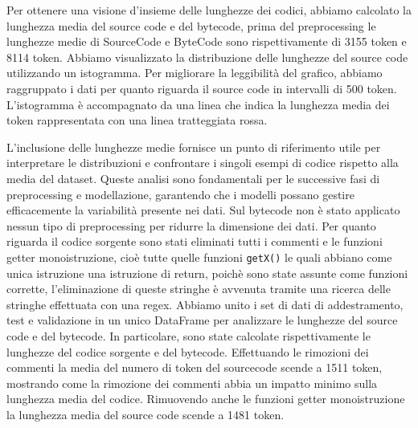\documentclass[../../Thesis.tex]{subfiles}
\begin{document}
Per ottenere una visione d'insieme delle lunghezze dei codici, abbiamo calcolato la lunghezza media del source code e del bytecode, prima del preprocessing le lunghezze medie di SourceCode e ByteCode sono rispettivamente di 3155 token e 8114 token.
Abbiamo visualizzato la distribuzione delle lunghezze del source code utilizzando un istogramma. Per migliorare la leggibilità del grafico, abbiamo raggruppato i dati per quanto riguarda il source code in intervalli di 500 token. L'istogramma è accompagnato da una linea che indica la lunghezza media dei token rappresentata con una linea tratteggiata rossa.

L'inclusione delle lunghezze medie fornisce un punto di riferimento utile per interpretare le distribuzioni e confrontare i singoli esempi di codice rispetto alla media del dataset. Queste analisi sono fondamentali per le successive fasi di preprocessing e modellazione, garantendo che i modelli possano gestire efficacemente la variabilità presente nei dati.
Sul bytecode non è stato applicato nessun tipo di preprocessing per ridurre la dimensione dei dati. Per quanto riguarda il codice sorgente sono stati eliminati tutti i commenti e le funzioni getter monoistruzione, cioè tutte quelle funzioni \texttt{getX()} le quali abbiano come unica istruzione una istruzione di return, poichè sono state assunte come funzioni corrette, l'eliminazione di queste stringhe è avvenuta tramite una ricerca delle stringhe effettuata con una regex.
Abbiamo unito i set di dati di addestramento, test e validazione in un unico DataFrame per analizzare le lunghezze del source code e del bytecode. In particolare, sono state calcolate rispettivamente le lunghezze del codice sorgente e del bytecode. Effettuando le rimozioni dei commenti la media del numero di token del sourcecode scende a 1511 token, mostrando come la rimozione dei commenti abbia un impatto minimo sulla lunghezza media del codice. Rimuovendo anche le funzioni getter monoistruzione la lunghezza media del source code scende a 1481 token.
\end{document}

